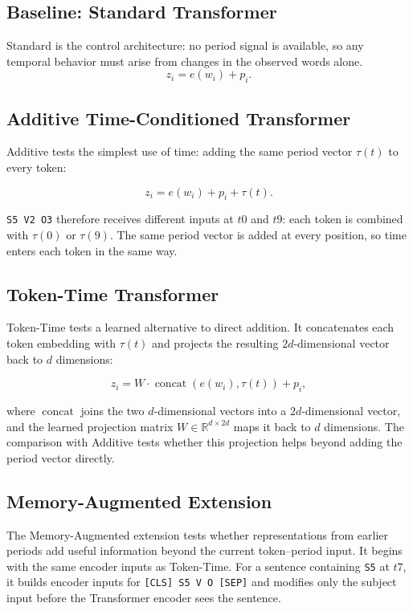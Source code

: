 \documentclass[runningheads]{llncs}
\begin{document}
\subsection{Baseline: Standard Transformer}
Standard is the control architecture: no period signal is available, so any temporal
behavior must arise from changes in the observed words alone.
\[
  z_i = e(w_i) + p_i .
\]

\subsection{Additive Time-Conditioned Transformer}
Additive tests the simplest use of time: adding the same period vector
\(\tau(t)\) to every token:

\[
  z_i = e(w_i) + p_i + \tau(t).
\]

\texttt{S5 V2 O3} therefore receives different inputs at \(t0\) and \(t9\):
each token is combined with \(\tau(0)\) or \(\tau(9)\). The same period vector
is added at every position, so time enters each token in the same way.

\subsection{Token-Time Transformer}
Token-Time tests a learned alternative to direct addition. It concatenates each
token embedding with \(\tau(t)\) and projects the resulting \(2d\)-dimensional
vector back to \(d\) dimensions:

\[
  z_i = W \cdot \operatorname{concat}\!\left(e(w_i), \tau(t)\right) + p_i ,
\]

where \(\operatorname{concat}\) joins the two \(d\)-dimensional vectors into a
\(2d\)-dimensional vector, and the learned projection matrix
\(W \in \mathbb{R}^{d \times 2d}\) maps it back to \(d\) dimensions. The
comparison with Additive tests whether this projection helps beyond adding the
period vector directly.

\subsection{Memory-Augmented Extension}
The Memory-Augmented extension tests whether representations from earlier
periods add useful information beyond the current token--period input. It
begins with the same encoder inputs as Token-Time. For a sentence containing
\texttt{S5} at \(t7\), it builds encoder inputs for
\texttt{[CLS] S5 V O [SEP]} and modifies only the subject input before the
Transformer encoder sees the sentence.
\end{document}
